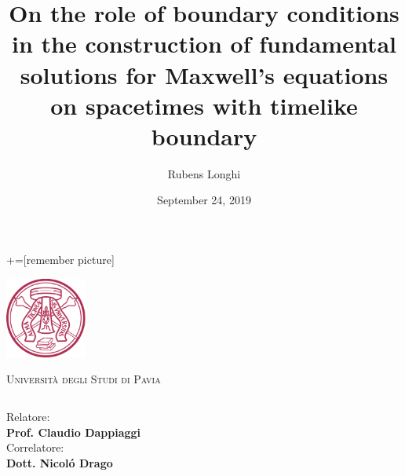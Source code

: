 \documentclass[10pt]{beamer} %
\author{Rubens Longhi}
\title[On the role of boundary conditions in the construction of fundamental solutions for Maxwell's eqns. on spacetimes with timelike boundary]{On the role of boundary conditions in the construction of fundamental solutions for Maxwell's equations on spacetimes with timelike boundary}
\date{September 24, 2019}
\begin{document}
+=[remember picture]


\begin{frame}
	\centering
	\includegraphics[width=0.2\textwidth]{unipv}\par\vspace{-0.4cm}
	\begin{center}
		\noindent%
		\textsc{Universit\`a degli Studi di Pavia}
	\end{center}
\vspace{-0.6cm}
\begin{center}
	\begin{block}
		
		\begin{center}
			{\large \textcolor{blue!50!black}{\inserttitle}}
		\end{center}
		
	\end{block}
	
\end{center}

\vspace{-0.5cm}

\hfill	\begin{columns}[t]
	
	\begin{column}{.3\linewidth}
		
		
		{\footnotesize Relatore:\\
			\textbf{Prof. Claudio Dappiaggi}\\[.3cm]} %
		{\footnotesize Correlatore:\\
			\textbf{Dott. Nicol\'o Drago}\\[.3cm]} %
		

\end{column}
\end{columns}
\end{frame}
\end{document}

